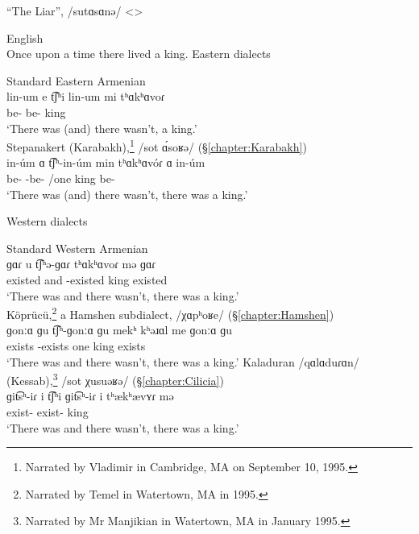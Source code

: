 \documentclass[output=paper]{langscibook}
\begin{document}
\begin{exe}
    \ex ``The Liar'',  /sutɑsɑnǝ/ <> \label{vaux:ex:the liar}
    \begin{xlist}
        \ex English  \\
Once upon a time there lived a king. 
\ex Eastern dialects
\begin{xlist}
\ex Standard Eastern Armenian  \\
\gll lin-um e t͡ʃʰi lin-um mi tʰɑkʰɑvoɾ \\
be-{\impfcvb} {\aux} {\neggloss} be-{\impfcvb}  {\indf} king \\
\trans `There was (and) there wasn't, a king.' \\
\ex  Stepanakert  (Karabakh),\footnote{Narrated by Vladimir in Cambridge, MA on September 10, 1995.} /sot \'ɑsoʁǝ/  (\S\ref{chapter:Karabakh}) \\
\gll in-úm ɑ t͡ʃʰ-in-úm min tʰɑkʰɑvóɾ ɑ in-úm \\
be-{\impfcvb} {\aux} {\neggloss}-be-{\impfcvb}  {\indf}/one king  {\aux} be-{\impfcvb}  \\
 \trans `There was (and) there wasn't, there was a king.' \\
 
 
\end{xlist}
\ex Western dialects
\begin{xlist}
    \ex Standard Western Armenian  \\
   \gll   ɡɑɾ u t͡ʃʰə-ɡɑɾ tʰɑkʰɑvoɾ mə ɡɑɾ \\
existed and {\neggloss}-existed king {\indf} existed \\ 
\trans `There was and there wasn't,  there was a king.' \\
  \ex Köprücü,\footnote{Narrated by Temel in Watertown, MA in 1995.}  a Hamshen subdialect, /χɑpʰoʁe/   (\S\ref{chapter:Hamshen})\\
   \gll   ɡonːɑ ɡu t͡ʃʰ-ɡonːɑ ɡu mekʰ kʰǝɹɑl me ɡonːɑ ɡu\\
exists {\ind} {\neggloss}-exists {\ind} one king {\indf} exists {\ind} \\ 
\trans `There was and there wasn't, there was a king.'  
\ex  Kaladuran /qɑlɑduɾɑn/  (Kessab),\footnote{Narrated by Mr Manjikian in Watertown, MA in January 1995.}  /sot χusuǝʁǝ/   (\S\ref{chapter:Cilicia})\\
   \gll   ɡit͡sʰ-iɾ i t͡ʃʰi ɡit͡sʰ-iɾ i tʰækʰævʏɾ mǝ \\
exist-{\eptcp} {\aux} {\neggloss} exist-{\eptcp} {\aux} king {\indf} \\ 
\trans `There was and there wasn't,   there was a king.' 
 
\end{xlist}
    \end{xlist}
\end{exe} 
\end{document}
